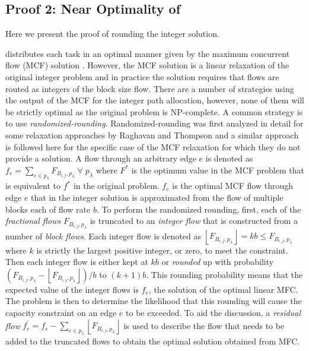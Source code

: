 \subsection{Proof 2: Near Optimality of \name}\label{appendix:optimality}

Here we present the proof of rounding the integer solution.

\name distributes each task in an optimal manner given by the maximum concurrent flow (MCF) solution \cite{reed2012traffic}. However, the MCF solution is a linear relaxation of the original integer problem and in practice the solution requires that flows are routed as integers of the block size flow. There are a number of strategies using the output of the MCF for the integer path allocation, however, none of them will be strictly optimal as the original problem is NP-complete. A common strategy is to use \emph{randomized-rounding}. Randomized-rounding was first analyzed in detail for some relaxation approaches by Raghavan and Thompson \cite{Raghavan1987} and a similar approach is followed here for the specific case of the MCF relaxation for which they do not provide a solution. A flow through an arbitrary edge \(e\) is denoted as \(f_e=\sum_{e \in p_\lambda} F_{B_{i,j},p_\lambda} \; \forall \; p_\lambda\) where $F^*$ is the optimum value in the MCF problem that is equivalent to $f^*$ in the original problem. $f_e$ is the optimal MCF flow through edge $e$ that in the integer solution is approximated from the flow of multiple blocks each of flow rate $b$. To perform the randomized rounding, first, each of the \emph{fractional flows}  $F_{B_{i,j},p_\lambda}$ is truncated to an \emph{integer flow} that is constructed from a number of\emph{ block flows}. Each integer flow is denoted as $\left \lfloor F_{B_{i,j},p_\lambda} \right \rfloor = kb \leq F_{B_{i,j},p_\lambda}$ where $k$ is strictly the largest positive integer, or zero, to meet the constraint. Then each integer flow is either kept at $kb$ or \emph{rounded} up with probability $(F_{B_{i,j},p_\lambda} - \left \lfloor{F_{B_{i,j},p_\lambda}} \right \rfloor)/b$ to $(k+1)b$. This rounding probability means that the expected value of the integer flows is $f_e$, the solution of the optimal linear MFC. The problem is then to determine the likelihood that this rounding will cause the capacity constraint on an edge $e$ to be exceeded. To aid the discussion, a \emph{residual flow}  $f^\prime_e=f_e - \sum_{e \in p_\lambda} \left \lfloor{F_{B_{i,j},p_\lambda}} \right \rfloor $ is used to describe the flow that needs to be added to the truncated flows to obtain the optimal solution obtained from MFC.

